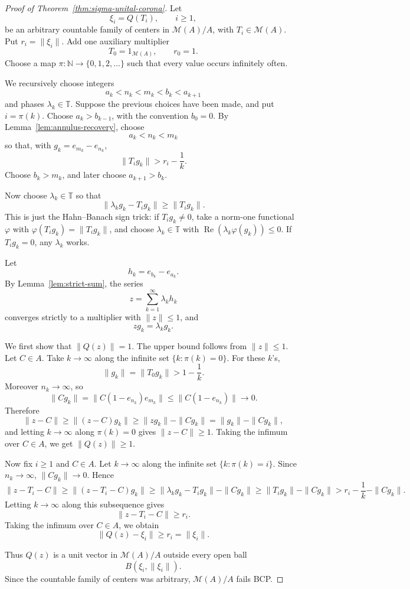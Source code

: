 \documentclass[11pt]{article}
\newcommand{\M}{\mathcal M}
\newcommand{\N}{\mathbb N}
\newcommand{\T}{\mathbb T}
\begin{document}
\begin{proof}[Proof of Theorem~\ref{thm:sigma-unital-corona}]
Let
\[
        \xi_i=Q(T_i),\qquad i\ge1,
\]
be an arbitrary countable family of centers in \(\M(A)/A\), with
\(T_i\in\M(A)\).  Put \(r_i=\|\xi_i\|\).  Add one auxiliary multiplier
\[
        T_0=1_{\M(A)},\qquad r_0=1.
\]
Choose a map \(\pi:\N\to\{0,1,2,\ldots\}\) such that every value occurs
infinitely often.

We recursively choose integers
\[
        a_k<n_k<m_k<b_k<a_{k+1}
\]
and phases \(\lambda_k\in\T\).  Suppose the previous choices have been made,
and put \(i=\pi(k)\).  Choose \(a_k>b_{k-1}\), with the convention
\(b_0=0\).  By Lemma~\ref{lem:annulus-recovery}, choose
\[
        a_k<n_k<m_k
\]
so that, with \(g_k=e_{m_k}-e_{n_k}\),
\[
        \|T_i g_k\|>r_i-\frac1k.
\]
Choose \(b_k>m_k\), and later choose \(a_{k+1}>b_k\).

Now choose \(\lambda_k\in\T\) so that
\[
        \|\lambda_k g_k-T_i g_k\|\ge \|T_i g_k\|.
\]
This is just the Hahn--Banach sign trick: if \(T_i g_k\ne0\), take a norm-one
functional \(\varphi\) with \(\varphi(T_i g_k)=\|T_i g_k\|\), and choose
\(\lambda_k\in\T\) with
\(\operatorname{Re}(\lambda_k\varphi(g_k))\le0\).  If \(T_i g_k=0\), any
\(\lambda_k\) works.

Let
\[
        h_k=e_{b_k}-e_{a_k}.
\]
By Lemma~\ref{lem:strict-sum}, the series
\[
        z=\sum_{k=1}^{\infty}\lambda_k h_k
\]
converges strictly to a multiplier with \(\|z\|\le1\), and
\[
        z g_k=\lambda_k g_k.
\]

We first show that \(\|Q(z)\|=1\).  The upper bound follows from \(\|z\|\le1\).
Let \(C\in A\).  Take \(k\to\infty\) along the infinite set
\(\{k:\pi(k)=0\}\).  For these \(k\)'s,
\[
        \|g_k\|=\|T_0g_k\|>1-\frac1k.
\]
Moreover \(n_k\to\infty\), so
\[
        \|C g_k\|
        =
        \|C(1-e_{n_k})e_{m_k}\|
        \le
        \|C(1-e_{n_k})\|\longrightarrow0.
\]
Therefore
\[
        \|z-C\|
        \ge
        \|(z-C)g_k\|
        \ge
        \|z g_k\|-\|C g_k\|
        =
        \|g_k\|-\|C g_k\|,
\]
and letting \(k\to\infty\) along \(\pi(k)=0\) gives \(\|z-C\|\ge1\).  Taking
the infimum over \(C\in A\), we get \(\|Q(z)\|\ge1\).

Now fix \(i\ge1\) and \(C\in A\).  Let \(k\to\infty\) along the infinite set
\(\{k:\pi(k)=i\}\).  Since \(n_k\to\infty\), \(\|Cg_k\|\to0\).  Hence
\[
        \|z-T_i-C\|
        \ge
        \|(z-T_i-C)g_k\|
        \ge
        \|\lambda_k g_k-T_ig_k\|-\|Cg_k\|
        \ge
        \|T_ig_k\|-\|Cg_k\|
        >
        r_i-\frac1k-\|Cg_k\|.
\]
Letting \(k\to\infty\) along this subsequence gives
\[
        \|z-T_i-C\|\ge r_i.
\]
Taking the infimum over \(C\in A\), we obtain
\[
        \|Q(z)-\xi_i\|\ge r_i=\|\xi_i\|.
\]

Thus \(Q(z)\) is a unit vector in \(\M(A)/A\) outside every open ball
\[
        B(\xi_i,\|\xi_i\|).
\]
Since the countable family of centers was arbitrary, \(\M(A)/A\) fails BCP.
\end{proof}
\end{document}
